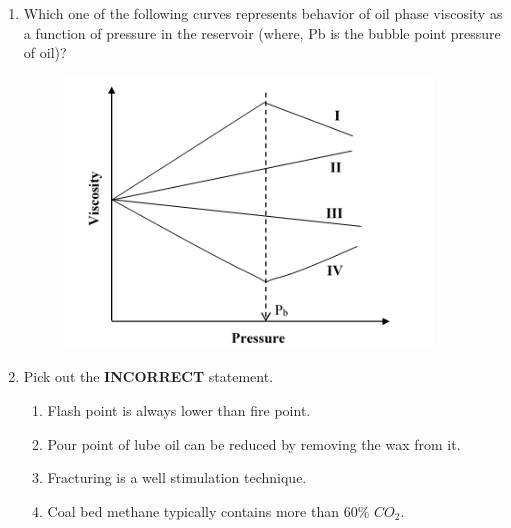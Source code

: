 \documentclass[12pt,a4paper]{article}
\begin{document}
\begin{enumerate}
\begin{enumerate}
\end{enumerate}

\pagebreak

\item Which one of the following curves represents behavior of oil phase viscosity as a function
of pressure in the reservoir (where, Pb is the bubble point pressure of oil)?\hfill{}\begin{figure}[h!]
  \centering
  \includegraphics[width=0.6\columnwidth]{figs/pic7.png} 
\end{figure}
\begin{enumerate}
\end{enumerate}

\item Pick out the \textbf{INCORRECT} statement.\hfill{}\begin{enumerate}
\item Flash point is always lower than fire point.
\item Pour point of lube oil can be reduced by removing the wax from it.
\item Fracturing is a well stimulation technique.
\item Coal bed methane typically contains more than 60\% $CO_2$.
\end{enumerate}


\end{enumerate}
\end{document}
